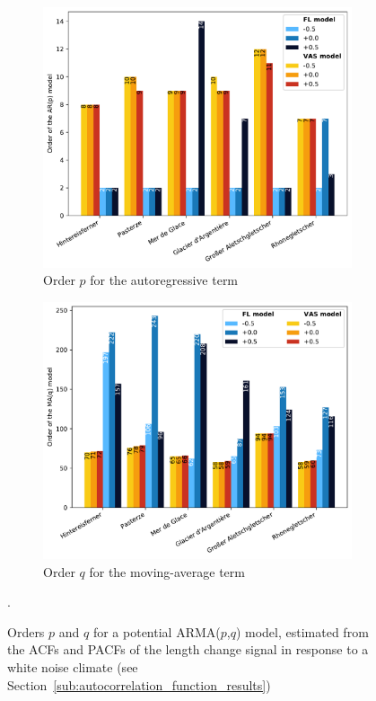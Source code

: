 \begin{figure}[h!]
  \centering

  \begin{subfigure}[b]{0.5\textwidth}
    \caption{Order $p$ for the autoregressive term}
    \label{fig:arma:arp}
    \centering
    \includegraphics[width=\textwidth]{../plots/final_plots/arma/arp.pdf}
  \end{subfigure}
  \hfill
  \begin{subfigure}[b]{0.5\textwidth}
    \caption{Order $q$ for the moving-average term}
    \label{fig:arma:maq}
    \centering
    \includegraphics[width=\textwidth]{../plots/final_plots/arma/maq.pdf}
  \end{subfigure}
  
  \caption{Orders $p$ and $q$ for a potential ARMA($p$,$q$) model, estimated from the ACFs and PACFs of the length change signal in response to a white noise climate (see Section~\ref{sub:autocorrelation_function_results})}.
  \label{fig:arma}
\end{figure}

